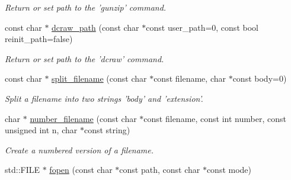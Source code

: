 \begin{DoxyCompactItemize}
\begin{DoxyCompactList}\small\item\em Return or set path to the 'gunzip' command. \item\end{DoxyCompactList}\item 
\hypertarget{namespacecimg__library_1_1cimg_ae36d7a689692ac5663afe1bbdab5d9fa}{
const char $\ast$ \hyperlink{namespacecimg__library_1_1cimg_ae36d7a689692ac5663afe1bbdab5d9fa}{dcraw\_\-path} (const char $\ast$const user\_\-path=0, const bool reinit\_\-path=false)}
\label{namespacecimg__library_1_1cimg_ae36d7a689692ac5663afe1bbdab5d9fa}

\begin{DoxyCompactList}\small\item\em Return or set path to the 'dcraw' command. \item\end{DoxyCompactList}\item 
\hypertarget{namespacecimg__library_1_1cimg_a9f7068ec0354e0b34a69a9dc829598aa}{
const char $\ast$ \hyperlink{namespacecimg__library_1_1cimg_a9f7068ec0354e0b34a69a9dc829598aa}{split\_\-filename} (const char $\ast$const filename, char $\ast$const body=0)}
\label{namespacecimg__library_1_1cimg_a9f7068ec0354e0b34a69a9dc829598aa}

\begin{DoxyCompactList}\small\item\em Split a filename into two strings 'body' and 'extension'. \item\end{DoxyCompactList}\item 
\hypertarget{namespacecimg__library_1_1cimg_a878d8296e87c4ddae1676158e40cbd3a}{
char $\ast$ \hyperlink{namespacecimg__library_1_1cimg_a878d8296e87c4ddae1676158e40cbd3a}{number\_\-filename} (const char $\ast$const filename, const int number, const unsigned int n, char $\ast$const string)}
\label{namespacecimg__library_1_1cimg_a878d8296e87c4ddae1676158e40cbd3a}

\begin{DoxyCompactList}\small\item\em Create a numbered version of a filename. \item\end{DoxyCompactList}\item 
\hypertarget{namespacecimg__library_1_1cimg_a19ad60edf05bad32e75b7077509ef566}{
std::FILE $\ast$ \hyperlink{namespacecimg__library_1_1cimg_a19ad60edf05bad32e75b7077509ef566}{fopen} (const char $\ast$const path, const char $\ast$const mode)}
\label{namespacecimg__library_1_1cimg_a19ad60edf05bad32e75b7077509ef566}


\end{DoxyCompactItemize}
